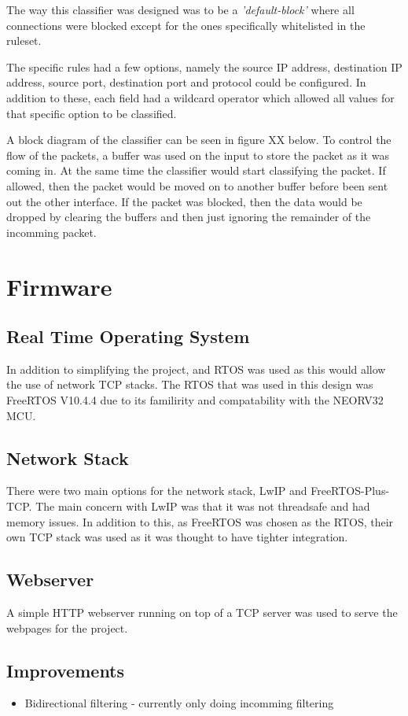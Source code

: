 The way this classifier was designed was to be a \textit{'default-block'} where all connections were blocked except for the ones specifically whitelisted in the ruleset. 

The specific rules had a few options, namely the source IP address, destination IP address, source port, destination port and protocol could be configured. In addition to these, each field had a wildcard operator which allowed all values for that specific option to be classified. 

A block diagram of the classifier can be seen in figure XX below. To control the flow of the packets, a buffer was used on the input to store the packet as it was coming in. At the same time the classifier would start classifying the packet. If allowed, then the packet would be moved on to another buffer before been sent out the other interface. If the packet was blocked, then the data would be dropped by clearing the buffers and then just ignoring the remainder of the incomming packet. 





\section{Firmware}

\subsection{Real Time Operating System}
In addition to simplifying the project, and RTOS was used as this would allow the use of network TCP stacks. The RTOS that was used in this design was FreeRTOS V10.4.4 due to its familirity and compatability with the NEORV32 MCU.


\subsection{Network Stack}
There were two main options for the network stack, LwIP and FreeRTOS-Plus-TCP. The main concern with LwIP was that it was not threadsafe and had memory issues. In addition to this, as FreeRTOS was chosen as the RTOS, their own TCP stack was used as it was thought to have tighter integration. 


\subsection{Webserver}
A simple HTTP webserver running on top of a TCP server was used to serve the webpages for the project. 


\subsection{Improvements}

\begin{itemize}
    \item Bidirectional filtering - currently only doing incomming filtering
\end{itemize}